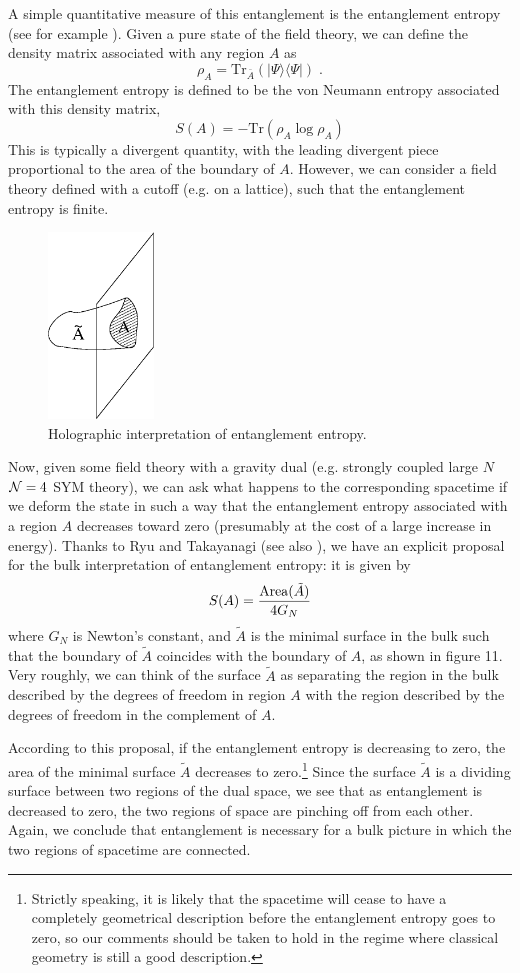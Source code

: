 \documentclass[12pt,epsf]{article}
\renewcommand{\(}{\left(}
\renewcommand{\)}{\right)}
\newcommand{\tr}{\mathrm{Tr}}
\begin{document}
A simple quantitative measure of this entanglement is the entanglement entropy (see for example \cite{nc}). Given a pure state of the field theory, we can define the density matrix associated with any region $A$ as
\[
\rho_A = \tr_{\bar{A}}(|\Psi \rangle \langle \Psi |) \; .
\]
The entanglement entropy is defined to be the von Neumann entropy associated with this density matrix,
\[
S(A) = - \tr( \rho_A \log \rho_A)
\]
This is typically a divergent quantity, with the leading divergent piece proportional to the area of the boundary of $A$. However, we can consider a field theory defined with a cutoff (e.g. on a lattice), such that the entanglement entropy is finite.

\begin{figure}
\centering
\includegraphics[width=0.25\textwidth]{holent.eps}
\caption{Holographic interpretation of entanglement entropy.}
\end{figure}

Now, given some field theory with a gravity dual (e.g. strongly coupled large $N$ ${\cal N}=4$ SYM theory), we can ask what happens to the corresponding spacetime if we deform the state in such a way that the entanglement entropy associated with a region $A$ decreases toward zero (presumably at the cost of a large increase in energy). Thanks to Ryu and Takayanagi \cite{rt} (see also \cite{proof,hrt,hr,nrt}), we have an explicit proposal for the bulk interpretation of entanglement entropy: it is given by
\[
S(A) = {{\rm Area}(\tilde{A}) \over 4 G_N}
\]
where $G_N$ is Newton's constant, and $\tilde{A}$ is the minimal surface in the bulk such that the boundary of $\tilde{A}$ coincides with the boundary of $A$, as shown in figure 11. Very roughly, we can think of the surface $\tilde{A}$ as separating the region in the bulk described by the degrees of freedom in region $A$ with the region described by the degrees of freedom in the complement of $A$.

According to this proposal, if the entanglement entropy is decreasing to zero, the area of the minimal surface $\tilde{A}$ decreases to zero.\footnote{Strictly speaking, it is likely that the spacetime will cease to have a completely geometrical description before the entanglement entropy goes to zero, so our comments should be taken to hold in the regime where classical geometry is still a good description.} Since the surface $\tilde{A}$ is a dividing surface between two regions of the dual space, we see that as entanglement is decreased to zero, the two regions of space are pinching off from each other. Again, we conclude that entanglement is necessary for a bulk picture in which the two regions of spacetime are connected.
\end{document}
